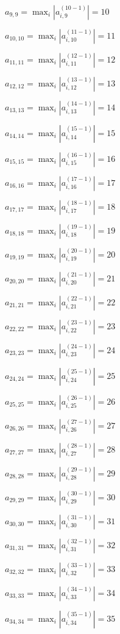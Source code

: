 \documentclass[a4paper,12pt]{article}
\begin{document}
$a _{ 9, 9 } =  \max _i |a _{ i, 9 } ^{ (10 - 1) } | = 10$

$a _{ 10, 10 } =  \max _i |a _{ i, 10 } ^{ (11 - 1) } | = 11$

$a _{ 11, 11 } =  \max _i |a _{ i, 11 } ^{ (12 - 1) } | = 12$

$a _{ 12, 12 } =  \max _i |a _{ i, 12 } ^{ (13 - 1) } | = 13$

$a _{ 13, 13 } =  \max _i |a _{ i, 13 } ^{ (14 - 1) } | = 14$

$a _{ 14, 14 } =  \max _i |a _{ i, 14 } ^{ (15 - 1) } | = 15$

$a _{ 15, 15 } =  \max _i |a _{ i, 15 } ^{ (16 - 1) } | = 16$

$a _{ 16, 16 } =  \max _i |a _{ i, 16 } ^{ (17 - 1) } | = 17$

$a _{ 17, 17 } =  \max _i |a _{ i, 17 } ^{ (18 - 1) } | = 18$

$a _{ 18, 18 } =  \max _i |a _{ i, 18 } ^{ (19 - 1) } | = 19$

$a _{ 19, 19 } =  \max _i |a _{ i, 19 } ^{ (20 - 1) } | = 20$

$a _{ 20, 20 } =  \max _i |a _{ i, 20 } ^{ (21 - 1) } | = 21$

$a _{ 21, 21 } =  \max _i |a _{ i, 21 } ^{ (22 - 1) } | = 22$

$a _{ 22, 22 } =  \max _i |a _{ i, 22 } ^{ (23 - 1) } | = 23$

$a _{ 23, 23 } =  \max _i |a _{ i, 23 } ^{ (24 - 1) } | = 24$

$a _{ 24, 24 } =  \max _i |a _{ i, 24 } ^{ (25 - 1) } | = 25$

$a _{ 25, 25 } =  \max _i |a _{ i, 25 } ^{ (26 - 1) } | = 26$

$a _{ 26, 26 } =  \max _i |a _{ i, 26 } ^{ (27 - 1) } | = 27$

$a _{ 27, 27 } =  \max _i |a _{ i, 27 } ^{ (28 - 1) } | = 28$

$a _{ 28, 28 } =  \max _i |a _{ i, 28 } ^{ (29 - 1) } | = 29$

$a _{ 29, 29 } =  \max _i |a _{ i, 29 } ^{ (30 - 1) } | = 30$

$a _{ 30, 30 } =  \max _i |a _{ i, 30 } ^{ (31 - 1) } | = 31$

$a _{ 31, 31 } =  \max _i |a _{ i, 31 } ^{ (32 - 1) } | = 32$

$a _{ 32, 32 } =  \max _i |a _{ i, 32 } ^{ (33 - 1) } | = 33$

$a _{ 33, 33 } =  \max _i |a _{ i, 33 } ^{ (34 - 1) } | = 34$

$a _{ 34, 34 } =  \max _i |a _{ i, 34 } ^{ (35 - 1) } | = 35$
\end{document}
